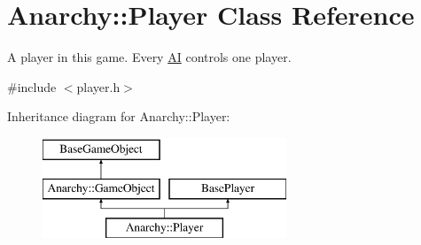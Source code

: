 \hypertarget{classAnarchy_1_1Player}{\section{Anarchy\-:\-:Player Class Reference}
\label{classAnarchy_1_1Player}
}


A player in this game. Every \hyperlink{classAnarchy_1_1AI}{A\-I} controls one player.  




{\ttfamily \#include $<$player.\-h$>$}

Inheritance diagram for Anarchy\-:\-:Player\-:\begin{figure}[H]
\begin{center}
\leavevmode
\includegraphics[height=3.000000cm]{classAnarchy_1_1Player}
\end{center}
\end{figure}

